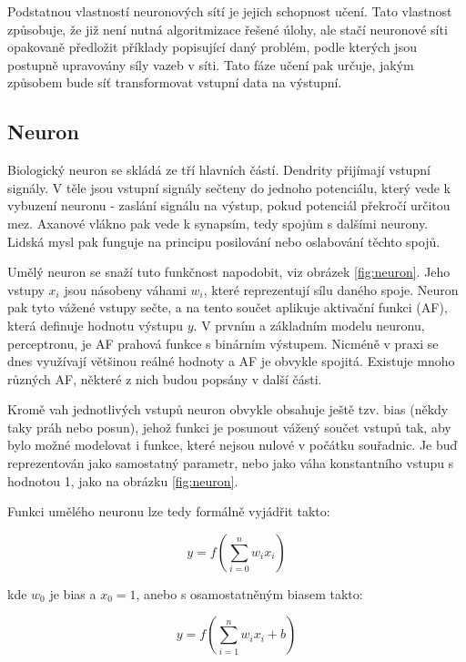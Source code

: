 Podstatnou vlastností neuronových sítí je jejich schopnost učení. Tato
vlastnost způsobuje, že již není nutná algoritmizace řešené úlohy, ale stačí
neuronové síti opakovaně předložit příklady popisující daný problém, podle
kterých jsou postupně upravovány síly vazeb v síti. Tato fáze učení pak určuje,
jakým způsobem bude síť transformovat vstupní data na
výstupní.\cite{Vondrak1994}

\subsection{Neuron}
Biologický neuron se skládá ze tří hlavních částí. Dendrity přijímají vstupní
signály. V těle jsou vstupní signály sečteny do jednoho potenciálu, který vede
k vybuzení neuronu - zaslání signálu na výstup, pokud potenciál překročí
určitou mez. Axanové vlákno pak vede k synapsím, tedy spojům s dalšími neurony.
Lidská mysl pak funguje na principu posilování nebo oslabování těchto spojů.

Umělý neuron se snaží tuto funkčnost napodobit, viz obrázek \ref{fig:neuron}.
Jeho vstupy $x_i$ jsou násobeny váhami $w_i$, které reprezentují sílu daného
spoje. Neuron pak tyto vážené vstupy sečte, a na tento součet aplikuje
aktivační funkci (AF), která definuje hodnotu výstupu $y$. V prvním a základním
modelu neuronu, perceptronu, je AF prahová funkce s binárním výstupem. Nicméně
v praxi se dnes využívají většinou reálné hodnoty a AF je obvykle spojitá.
\cite{Vondrak1994} Existuje mnoho různých AF, některé z nich budou popsány v
další části.

Kromě vah jednotlivých vstupů neuron obvykle obsahuje ještě tzv. bias (někdy
taky práh nebo posun), jehož funkci je posunout vážený součet vstupů tak, aby
bylo možné modelovat i funkce, které nejsou nulové v počátku souřadnic. Je buď
reprezentován jako samostatný parametr, nebo jako váha konstantního vstupu s
hodnotou 1, jako na obrázku \ref{fig:neuron}.

Funkci umělého neuronu lze tedy formálně vyjádřit takto:

\begin{equation*}
    y=f\left(\sum_{i=0}^{n}w_{i}x_{i}\right)
\end{equation*}

kde $w_0$ je bias a $x_0=1$, anebo s osamostatněným biasem takto:

\begin{equation*}
    y = f\left(\sum_{i=1}^{n} w_i x_i + b\right)
\end{equation*}

